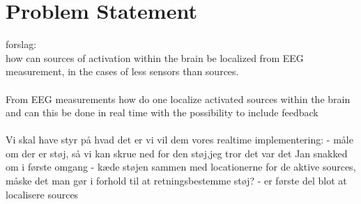 \chapter{Problem Statement}
forslag:\\
how can sources of activation within the brain be localized from EEG measurement, in the cases of less sensors than sources.\\
\\
From EEG measurements how do one localize activated sources within the brain and can this be done in real time with the possibility to include feedback 
\\ \\

Vi skal have styr på hvad det er vi vil dem vores realtime implementering: 
- måle om der er støj, så vi kan skrue ned for den støj,jeg tror det var det Jan snakked om i første omgang 
- kæde støjen sammen med locationerne for de aktive sources, måske det man gør i forhold til at retningsbestemme støj? 
- er første del blot at localisere sources  

 